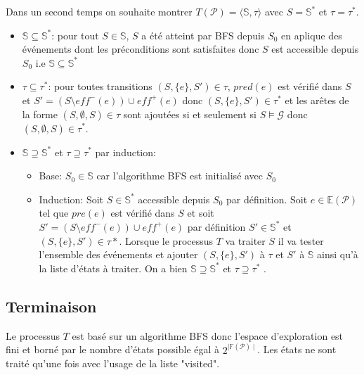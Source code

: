 Dans un second temps on souhaite montrer $T(\mathcal{P}) = \langle \mathds{S}, \tau \rangle$ avec $S = \mathds{S}^*$ et $\tau = \tau^*$.
\begin{itemize}
    \item $\mathds{S} \subseteq \mathds{S}^*$: pour tout $S\in \mathds{S}$, $S$ a été atteint par BFS depuis $S_0$ en aplique des événements dont les préconditions sont satisfaites donc $S$ est accessible depuis $S_0$ i.e $\mathds{S} \subseteq \mathds{S}^*$
    \item $\tau \subseteq \tau^*$: pour toutes transitions $(S, \{e\}, S')\in \tau$,  $pred(e)$ est vérifié dans $S$ et $S' = (S \setminus eff^-(e)) \cup eff^+(e)$ donc $(S, \{e\}, S') \in \tau^*$ et les arêtes de la forme $(S, \emptyset, S)\in \tau$ sont ajoutées si et seulement si  $S \models \mathcal{G}$ donc $(S, \emptyset, S)\in \tau^*$.
    \item $\mathds{S} \supseteq \mathds{S}^* $ et $\tau \supseteq \tau^*$ par induction: 
    \begin{itemize}
        \item Base: $S_0 \in \mathds{S}$ car l'algorithme BFS est initialisé avec $S_0$
        \item Induction: Soit $S\in \mathds{S}^*$ accessible depuis $S_0$ par définition. Soit $e \in \mathds{E}(\mathcal{P})$ tel que $pre(e)$ est vérifié dans $S$ et soit $S' = (S \setminus eff^-(e)) \cup eff^+(e)$ par définition $S'\in \mathds{S}^*$ et $(S,\{e\}, S') \in \tau*$. Lorsque le processus $T$ va traiter $S$ il va tester l'ensemble des événements et ajouter $(S,\{e\}, S')$ à $\tau$ et $S'$ à $\mathds{S}$ ainsi qu'à la liste d'états à traiter. On a bien $\mathds{S} \supseteq \mathds{S}^* $ et $\tau \supseteq \tau^*$ .
        \end{itemize}
 \end{itemize}

\subsection{Terminaison}
Le processus $T$ est basé sur un algorithme BFS donc l'espace d'exploration est fini et borné par le nombre d'états possible égal à $2^{\mid \mathds{F}(\mathcal{P}) \mid}$. Les états ne sont traité qu'une fois avec l'usage de la liste "visited".